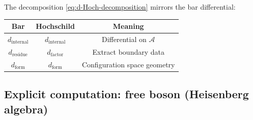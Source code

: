 \begin{remark}
The decomposition \eqref{eq:d-Hoch-decomposition} mirrors the bar differential:
\begin{center}
\begin{tabular}{c|c|c}
\textbf{Bar} & \textbf{Hochschild} & \textbf{Meaning} \\
\hline
$d_{\text{internal}}$ & $d_{\text{internal}}$ & Differential on $\mathcal{A}$ \\
$d_{\text{residue}}$ & $d_{\text{factor}}$ & Extract boundary data \\
$d_{\text{form}}$ & $d_{\text{form}}$ & Configuration space geometry \\
\end{tabular}
\end{center}
\end{remark}

\subsection{Explicit computation: free boson (Heisenberg algebra)}

